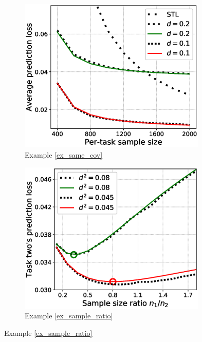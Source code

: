 \begin{figure}[!t]
	\begin{subfigure}[b]{0.33\textwidth}
		\centering
		\includegraphics[width=0.98\textwidth]{figures/same_covariates.eps}
		\caption{Example \ref{ex_same_cov}}
		\label{fig_same_cov}
	\end{subfigure}\hfill
	\begin{subfigure}[b]{0.33\textwidth}
		\centering
		\includegraphics[width=0.98\textwidth]{figures/sample_ratio_several_d.eps}
		\caption{Example \ref{ex_sample_ratio}}
		\label{fig_size}
	\end{subfigure}\hfill

\end{figure}
